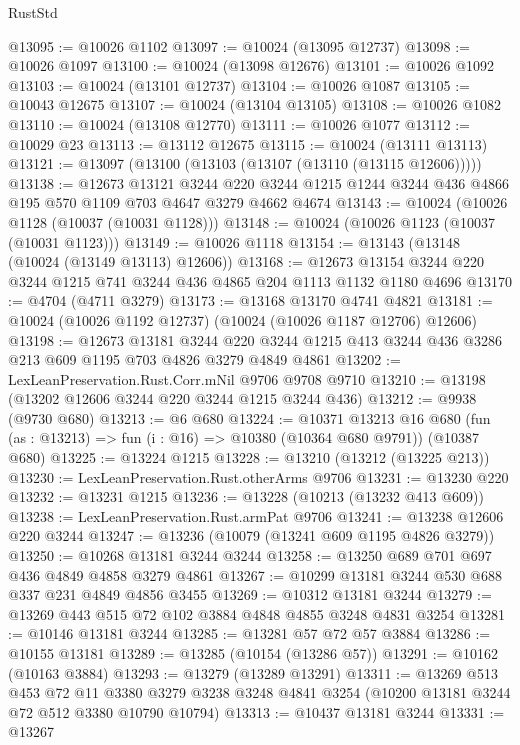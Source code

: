 \begin{lexlean}{RustStd}
\begin{coremodule}
{\begin{coremodule}
{{{{{{{{{{{{{{{{{{{{{{{{{{@13095 := @10026 @1102
@13097 := @10024 (@13095 @12737)
@13098 := @10026 @1097
@13100 := @10024 (@13098 @12676)
@13101 := @10026 @1092
@13103 := @10024 (@13101 @12737)
@13104 := @10026 @1087
@13105 := @10043 @12675
@13107 := @10024 (@13104 @13105)
@13108 := @10026 @1082
@13110 := @10024 (@13108 @12770)
@13111 := @10026 @1077
@13112 := @10029 @23
@13113 := @13112 @12675
@13115 := @10024 (@13111 @13113)
@13121 := @13097 (@13100 (@13103 (@13107 (@13110 (@13115 @12606)))))
@13138 := @12673
    @13121
    @3244
    @220
    @3244
    @1215
    @1244
    @3244
    @436
    @4866
    @195
    @570
    @1109
    @703
    @4647
    @3279
    @4662
    @4674
@13143 := @10024 (@10026 @1128 (@10037 (@10031 @1128)))
@13148 := @10024 (@10026 @1123 (@10037 (@10031 @1123)))
@13149 := @10026 @1118
@13154 := @13143 (@13148 (@10024 (@13149 @13113) @12606))
@13168 := @12673 @13154 @3244 @220 @3244 @1215 @741 @3244 @436 @4865 @204 @1113 @1132 @1180 @4696
@13170 := @4704 (@4711 @3279)
@13173 := @13168 @13170 @4741 @4821
@13181 := @10024 (@10026 @1192 @12737) (@10024 (@10026 @1187 @12706) @12606)
@13198 := @12673
    @13181
    @3244
    @220
    @3244
    @1215
    @413
    @3244
    @436
    @3286
    @213
    @609
    @1195
    @703
    @4826
    @3279
    @4849
    @4861
@13202 := LexLeanPreservation.Rust.Corr.mNil @9706 @9708 @9710
@13210 := @13198 (@13202 @12606 @3244 @220 @3244 @1215 @3244 @436)
@13212 := @9938 (@9730 @680)
@13213 := @6 @680
@13224 := @10371
    @13213
    @16
    @680
    (fun (as : @13213) => fun (i : @16) => @10380 (@10364 @680 @9791))
    (@10387 @680)
@13225 := @13224 @1215
@13228 := @13210 (@13212 (@13225 @213))
@13230 := LexLeanPreservation.Rust.otherArms @9706
@13231 := @13230 @220
@13232 := @13231 @1215
@13236 := @13228 (@10213 (@13232 @413 @609))
@13238 := LexLeanPreservation.Rust.armPat @9706
@13241 := @13238 @12606 @220 @3244
@13247 := @13236 (@10079 (@13241 @609 @1195 @4826 @3279))
@13250 := @10268 @13181 @3244 @3244
@13258 := @13250 @689 @701 @697 @436 @4849 @4858 @3279 @4861
@13267 := @10299 @13181 @3244 @530 @688 @337 @231 @4849 @4856 @3455
@13269 := @10312 @13181 @3244
@13279 := @13269 @443 @515 @72 @102 @3884 @4848 @4855 @3248 @4831 @3254
@13281 := @10146 @13181 @3244
@13285 := @13281 @57 @72 @57 @3884
@13286 := @10155 @13181
@13289 := @13285 (@10154 (@13286 @57))
@13291 := @10162 (@10163 @3884)
@13293 := @13279 (@13289 @13291)
@13311 := @13269
    @513
    @453
    @72
    @11
    @3380
    @3279
    @3238
    @3248
    @4841
    @3254
    (@10200 @13181 @3244 @72 @512 @3380 @10790 @10794)
@13313 := @10437 @13181 @3244
@13331 := @13267
}}}}}}}}}}}}}}}}}}}}}}}}}}
\end{coremodule}}
\end{coremodule}
\end{lexlean}
